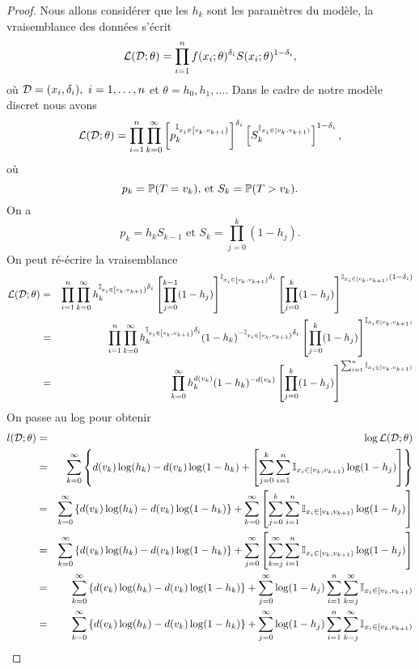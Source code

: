\begin{proof}
Nous allons considérer que les $h_k$ sont les paramètres du modèle, la vraisemblance des données s'écrit 
$$
\mathcal{L}(\mathcal{D};\theta) = \prod_{i=1}^n f(x_i; \theta)^{\delta_i}S(x_i;\theta)^{1-\delta_i},
$$
où $\mathcal{D} = (x_i,\delta_i),\text{ }i = 1,\ldots, n$ et $\theta = h_0, h_1,\ldots$. Dans le cadre de notre modèle discret nous avons
$$
\mathcal{L}(\mathcal{D};\theta) = \prod_{i=1}^n \prod_{k=0}^\infty \left[p_k^{\mathbb{I}_{x_i\in\left[v_k,v_{k+1}\right)}}\right]^{\delta_i}
\left[S_k^{\mathbb{I}_{x_i\in[v_k,v_{k+1})}}\right]^{1-\delta_i},
$$
où
$$
p_k = \mathbb{P}(T = v_k)\text{, et }S_k = \mathbb{P}(T > v_k).
$$
On a 
$$
p_k = h_k S_{k-1}\text{ et }S_k = \prod_{j = 0}^k(1-h_j).
$$
On peut ré-écrire la vraisemblance
\begin{eqnarray*}
\mathcal{L}(\mathcal{D};\theta) &=& \prod_{i=1}^n \prod_{k=0}^\infty h_k^{\mathbb{I}_{x_i\in\left[v_k,v_{k+1}\right)}\delta_i}\left[\prod_{j=0}^{k-1}(1-h_j)\right]^{\mathbb{I}_{x_i\in\left[v_k,v_{k+1}\right)}\delta_i}
\left[\prod_{j=0}^{k}(1-h_j)\right]^{\mathbb{I}_{x_i\in[v_k,v_{k+1})}(1-\delta_i)}\\
&=& \prod_{i=1}^n \prod_{k=0}^\infty h_k^{\mathbb{I}_{x_i\in\left[v_k,v_{k+1}\right)}\delta_i}(1-h_k)^{-\mathbb{I}_{x_i\in\left[v_k,v_{k+1}\right)}\delta_i}
\left[\prod_{j=0}^{k}(1-h_j)\right]^{\mathbb{I}_{x_i\in[v_k,v_{k+1})}}\\
&=& \prod_{k=0}^\infty h_k^{d(v_k)}(1-h_k)^{-d(v_k)}\left[\prod_{j=0}^{k}(1-h_j)\right]^{\sum_{i = 1}^n\mathbb{I}_{x_i\in[v_k,v_{k+1})}}
\end{eqnarray*}
On passe au log pour obtenir 
\begin{eqnarray*}
l(\Data;\theta) &=& \log\mathcal{L}(\Data;\theta)\\
&=& \sum_{k=0}^\infty \left\{d(v_k)\log(h_k)-d(v_k)\log(1-h_k) + \left[\sum_{j=0}^{k}\sum_{i = 1}^n\ind_{x_i\in[v_k,v_{k+1})}\log(1-h_j)\right]\right\}\\
&=&\sum_{k=0}^\infty \left\{d(v_k)\log(h_k)-d(v_k)\log(1-h_k)\right\} + \sum_{k=0}^\infty\left[\sum_{j=0}^{k}\sum_{i = 1}^n\ind_{x_i\in[v_k,v_{k+1})}\log(1-h_j)\right]\\
&=&\sum_{k=0}^\infty \left\{d(v_k)\log(h_k)-d(v_k)\log(1-h_k)\right\} + \sum_{j=0}^\infty\left[\sum_{k=j}^{\infty}\sum_{i = 1}^n\ind_{x_i\in[v_k,v_{k+1})}\log(1-h_j)\right]\\
&=&\sum_{k=0}^\infty \left\{d(v_k)\log(h_k)-d(v_k)\log(1-h_k)\right\} + \sum_{j=0}^\infty\log(1-h_j)\sum_{i = 1}^n\sum_{k=j}^{\infty}\ind_{x_i\in[v_k,v_{k+1})}\\
&=&\sum_{k=0}^\infty \left\{d(v_k)\log(h_k)-d(v_k)\log(1-h_k)\right\} + \sum_{j=0}^\infty\log(1-h_j)\sum_{i = 1}^n\sum_{k=j}^{\infty}\ind_{x_i\in[v_k,v_{k+1})}\\

\end{eqnarray*}
\end{proof}
